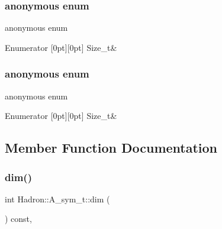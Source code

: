 \subsubsection{\texorpdfstring{anonymous enum}{anonymous enum}}
{\footnotesize\ttfamily anonymous enum}

\begin{DoxyEnumFields}{Enumerator}
[0pt][0pt]{}\mbox{\label{structHadron_1_1A__sym__t_a5a96037867b336b490c25161bcd9a2d8a5e8ea0c58f78c23bb8f1eb1c0b9e495f}} 
Size\+\_\+t&\\
\hline

\end{DoxyEnumFields}
\mbox{\label{structHadron_1_1A__sym__t_a5a96037867b336b490c25161bcd9a2d8}} 
\subsubsection{\texorpdfstring{anonymous enum}{anonymous enum}}
{\footnotesize\ttfamily anonymous enum}

\begin{DoxyEnumFields}{Enumerator}
[0pt][0pt]{}\mbox{\label{structHadron_1_1A__sym__t_a5a96037867b336b490c25161bcd9a2d8a5e8ea0c58f78c23bb8f1eb1c0b9e495f}} 
Size\+\_\+t&\\
\hline

\end{DoxyEnumFields}


\subsection{Member Function Documentation}
\mbox{\label{structHadron_1_1A__sym__t_a57e9460ee09050859f969d1f0cae0e92}} 
\subsubsection{\texorpdfstring{dim()}{dim()}\hspace{0.1cm}{\footnotesize\ttfamily [1/3]}}
{\footnotesize\ttfamily int Hadron\+::\+A\+\_\+sym\+\_\+t\+::dim (\begin{DoxyParamCaption}{ }\end{DoxyParamCaption}) const\hspace{0.3cm}{\ttfamily [inline]}, {\ttfamily [virtual]}}



